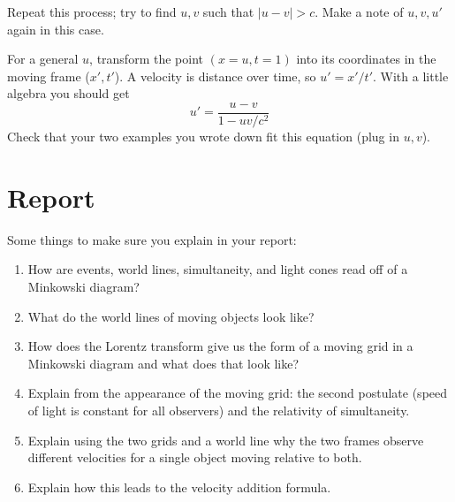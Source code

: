 \documentclass[phy1200]{handout}
\begin{document}
Repeat this process; try to find $u,v$ such that $|u-v|>c$. Make a note of $u,v,u'$ again in this case.

For a general $u$, transform the point $(x=u,t=1)$ into its coordinates in the moving frame ($x',t'$). A velocity is distance over time, so $u'=x'/t'$. With a little algebra you should get
$$
u'=\frac{u-v}{1-uv/c^2}
$$
Check that your two examples you wrote down fit this equation (plug in $u,v$).

\section{Report}
Some things to make sure you explain in your report:
\begin{enumerate}
    \item How are events, world lines, simultaneity, and light cones read off of a Minkowski diagram?
    \item What do the world lines of moving objects look like?
    \item How does the Lorentz transform give us the form of a moving grid in a Minkowski diagram and what does that look like? 
    \item Explain from the appearance of the moving grid: the second postulate (speed of light is constant for all observers) and the relativity of simultaneity.
    \item Explain using the two grids and a world line why the two frames observe different velocities for a single object moving relative to both.
    \item Explain how this leads to the velocity addition formula.
\end{enumerate}
\end{document}
